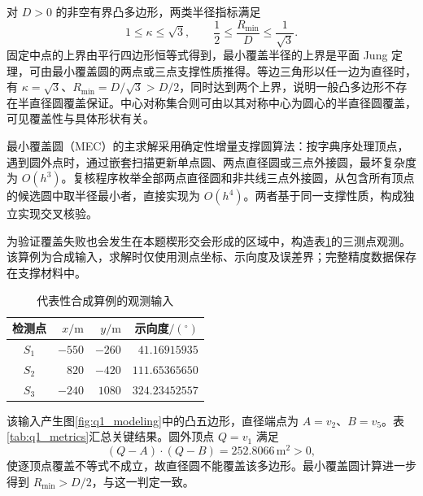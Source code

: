 \documentclass[zihao=-4,a4paper,UTF8,fontset=none]{ctexart}
\begin{document}
对 $D>0$ 的非空有界凸多边形，两类半径指标满足
\begin{equation}
1\le\kappa\le\sqrt3,\qquad
\frac12\le\frac{R_{\min}}{D}\le\frac1{\sqrt3}.
\label{eq:q1_bounds}
\end{equation}
固定中点的上界由平行四边形恒等式得到，最小覆盖半径的上界是平面 Jung 定理\cite{q1_jung1901}，可由最小覆盖圆的两点或三点支撑性质推得\cite{q1_welzl1991}。等边三角形以任一边为直径时，有 $\kappa=\sqrt3$、$R_{\min}=D/\sqrt3>D/2$，同时达到两个上界，说明一般凸多边形不存在半直径圆覆盖保证。中心对称集合则可由以其对称中心为圆心的半直径圆覆盖，可见覆盖性与具体形状有关。

最小覆盖圆（MEC）的主求解采用确定性增量支撑圆算法：按字典序处理顶点，遇到圆外点时，通过嵌套扫描更新单点圆、两点直径圆或三点外接圆，最坏复杂度为 $O(h^3)$。复核程序枚举全部两点直径圆和非共线三点外接圆，从包含所有顶点的候选圆中取半径最小者，直接实现为 $O(h^4)$。两者基于同一支撑性质，构成独立实现交叉核验。

为验证覆盖失败也会发生在本题楔形交会形成的区域中，构造表\ref{tab:q1_input}的三测点观测。该算例为合成输入，求解时仅使用测点坐标、示向度及误差界；完整精度数据保存在支撑材料中。
\begin{table}[H]
\centering
\caption{代表性合成算例的观测输入}
\label{tab:q1_input}
\begin{tabular}{crrr}
\toprule
检测点 & $x/\mathrm m$ & $y/\mathrm m$ & 示向度$/({}^\circ)$\\
\midrule
$S_1$ & $-550$ & $-260$ & $41.16915935$\\
$S_2$ & $820$ & $-420$ & $111.65365650$\\
$S_3$ & $-240$ & $1080$ & $324.23452557$\\
\bottomrule
\end{tabular}
\end{table}

该输入产生图\ref{fig:q1_modeling}中的凸五边形，直径端点为 $A=v_2$、$B=v_5$。表\ref{tab:q1_metrics}汇总关键结果。圆外顶点 $Q=v_1$ 满足
\[
(Q-A)\cdot(Q-B)=252.8066\,\mathrm m^2>0,
\]
使逐顶点覆盖不等式不成立，故直径圆不能覆盖该多边形。最小覆盖圆计算进一步得到 $R_{\min}>D/2$，与这一判定一致。
\end{document}
